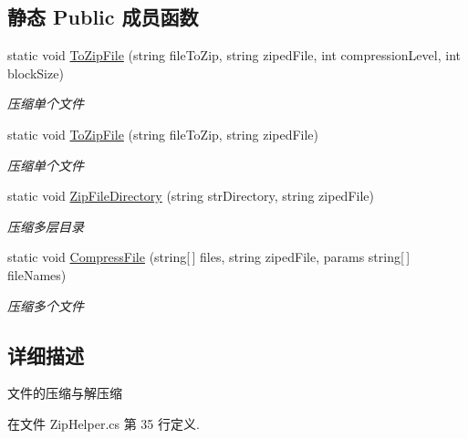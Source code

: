 \subsection*{静态 Public 成员函数}
\begin{DoxyCompactItemize}
\item 
static void \hyperlink{class_x_c_l_net_tools_1_1_file_handler_1_1_zip_helper_a4437b013f4b0db430cb1fd6097ed54a1}{To\-Zip\-File} (string file\-To\-Zip, string ziped\-File, int compression\-Level, int block\-Size)
\begin{DoxyCompactList}\small\item\em 压缩单个文件 \end{DoxyCompactList}\item 
static void \hyperlink{class_x_c_l_net_tools_1_1_file_handler_1_1_zip_helper_ab59c063455118d1eedb3a1af719db063}{To\-Zip\-File} (string file\-To\-Zip, string ziped\-File)
\begin{DoxyCompactList}\small\item\em 压缩单个文件 \end{DoxyCompactList}\item 
static void \hyperlink{class_x_c_l_net_tools_1_1_file_handler_1_1_zip_helper_a1231101acec5d274c2770115d1584ae3}{Zip\-File\-Directory} (string str\-Directory, string ziped\-File)
\begin{DoxyCompactList}\small\item\em 压缩多层目录 \end{DoxyCompactList}\item 
static void \hyperlink{class_x_c_l_net_tools_1_1_file_handler_1_1_zip_helper_abd0e8402a3d1ea9ca9f6c97cb46d5b89}{Compress\-File} (string\mbox{[}$\,$\mbox{]} files, string ziped\-File, params string\mbox{[}$\,$\mbox{]} file\-Names)
\begin{DoxyCompactList}\small\item\em 压缩多个文件 \end{DoxyCompactList}\end{DoxyCompactItemize}


\subsection{详细描述}
文件的压缩与解压缩 



在文件 Zip\-Helper.\-cs 第 35 行定义.



